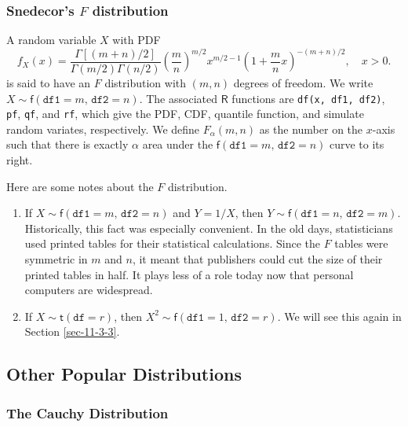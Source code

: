 \subsubsection{Snedecor's \(F\) distribution}
\label{sec-6-5-2-3}

A random variable \(X\) with PDF
\begin{equation}
f_{X}(x)=\frac{\Gamma[(m+n)/2]}{\Gamma(m/2)\Gamma(n/2)}\left(\frac{m}{n}\right)^{m/2}x^{m/2-1}\left(1+\frac{m}{n}x\right)^{-(m+n)/2},\quad x>0.
\end{equation}
is said to have an \(F\) distribution with \((m,n)\) degrees of
freedom. We write
\(X\sim\mathsf{f}(\mathtt{df1}=m,\,\mathtt{df2}=n)\). The associated
\(\mathsf{R}\) functions are \texttt{df(x, df1, df2)}, \texttt{pf}, \texttt{qf}, and \texttt{rf},
which give the PDF, CDF, quantile function, and simulate random
variates, respectively. We define \(F_{\alpha}(m,n)\) as the number on
the \(x\)-axis such that there is exactly \(\alpha\) area under the
\(\mathsf{f}(\mathtt{df1}=m,\,\mathtt{df2}=n)\) curve to its right.

\begin{rem}
Here are some notes about the \(F\) distribution.
\begin{enumerate}
\item If \(X\sim\mathsf{f}(\mathtt{df1}=m,\,\mathtt{df2}=n)\) and
\(Y=1/X\), then
\(Y\sim\mathsf{f}(\mathtt{df1}=n,\,\mathtt{df2}=m)\). Historically,
this fact was especially convenient. In the old days, statisticians
used printed tables for their statistical calculations. Since the
\(F\) tables were symmetric in \(m\) and \(n\), it meant that
publishers could cut the size of their printed tables in half. It
plays less of a role today now that personal computers are
widespread.
\item If \(X\sim\mathsf{t}(\mathtt{df}=r)\), then
\(X^{2}\sim\mathsf{f}(\mathtt{df1}=1,\,\mathtt{df2}=r)\). We will
see this again in Section \ref{sec-11-3-3}.
\end{enumerate}
\end{rem}

\subsection{Other Popular Distributions}
\label{sec-6-5-3}

\subsubsection{The Cauchy Distribution}
\label{sec-6-5-3-1}


